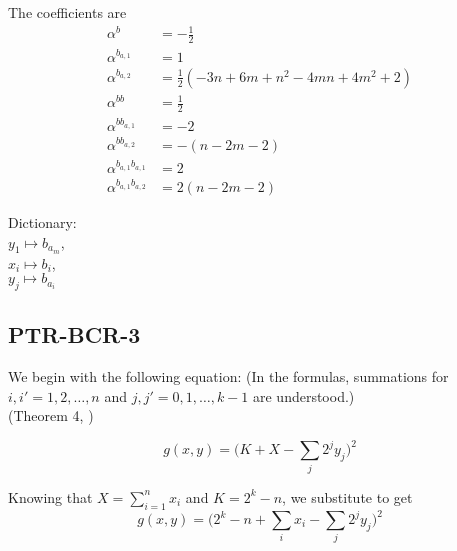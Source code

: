 \documentclass[english,notitlepage,longbibliography,showpacs,preprintnumbers,amsmath,amssymb,aps,prx,nofootinbib,12pt,superscriptaddress]{revtex4-1}
\begin{document}
\noindent The coefficients are
\begin{subequations}
\begin{align}
\alpha^b &= -\frac{1}{2}\\
\alpha^{b_{a,1}} &= 1\\
\alpha^{b_{a,2}} &= \frac{1}{2}(-3n + 6m + n^2 - 4mn + 4m^2 + 2)\\
\alpha^{bb} &= \frac{1}{2}\\
\alpha^{bb_{a,1}} &= -2\\
\alpha^{bb_{a,2}} &= -(n-2m-2)\\
\alpha^{b_{a,1}b_{a,1}} &= 2\\
\alpha^{b_{a,1}b_{a,2}} &= 2(n-2m-2)
\end{align}
\end{subequations}

\noindent Dictionary:\\
$y_{1}\mapsto b_{a_m}$,\\
$x_i\mapsto b_i$,\\
$y_j\mapsto b_{a_i}$\\



\subsection{PTR-BCR-3} %

We begin with the following equation:
(In the formulas, summations for $i,i' = 1,2,\dots,n$ and $j,j' = 0,1,\dots,k-1$ are understood.)
\\(Theorem 4, \cite{Boros2018boundsPaper})

\begin{equation}
  g(x,y) = \Big(K + X - \sum_{j} 2^j y_j\Big)^2
\end{equation}

\noindent Knowing that $X = \sum_{i=1}^n x_i$ and $K = 2^k - n$, we substitute to get
\begin{equation}
  g(x,y) = \Big(2^k - n + \sum_i x_i - \sum_{j} 2^j y_j\Big)^2
\end{equation}
\end{document}

